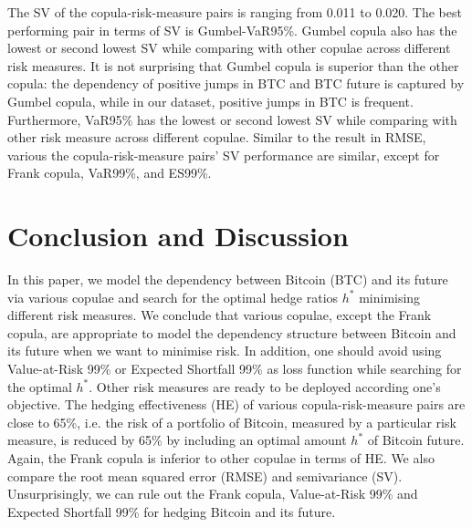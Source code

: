 
The SV of the copula-risk-measure pairs is ranging from 0.011 to 0.020.
The best performing pair in terms of SV is Gumbel-VaR95\%.
Gumbel copula also has the lowest or second lowest SV while comparing with other copulae across different risk measures.
It is not surprising that Gumbel copula is superior than the other copula:
the dependency of positive jumps in BTC and BTC future is captured by Gumbel copula, while in our dataset,
positive jumps in BTC is frequent.
Furthermore, VaR95\% has the lowest or second lowest SV while comparing with other risk measure across different copulae.
Similar to the result in RMSE, various the copula-risk-measure pairs' SV performance are similar, except for Frank copula, VaR99\%, and ES99\%.



\section{Conclusion and Discussion}
In this paper, we model the dependency between Bitcoin (BTC) and its future via various copulae and search for
the optimal hedge ratios $h^*$ minimising different risk measures.
We conclude that various copulae, except the Frank copula, are appropriate to model the dependency structure between Bitcoin and its future when we want to minimise risk.
In addition, one should avoid using Value-at-Risk 99\% or Expected Shortfall 99\% as loss function while searching for the optimal $h^*$.
Other risk measures are ready to be deployed according one's objective.
The hedging effectiveness (HE) of various copula-risk-measure pairs are close to 65\%, i.e.
the risk of a portfolio of Bitcoin, measured by a particular risk measure, is reduced
by 65\% by including an optimal amount $h^*$ of Bitcoin future.
Again, the Frank copula is inferior to other copulae in terms of HE.
We also compare the root mean squared error (RMSE) and semivariance (SV).
Unsurprisingly, we can rule out the Frank copula, Value-at-Risk 99\% and Expected Shortfall 99\%
for hedging Bitcoin and its future.

